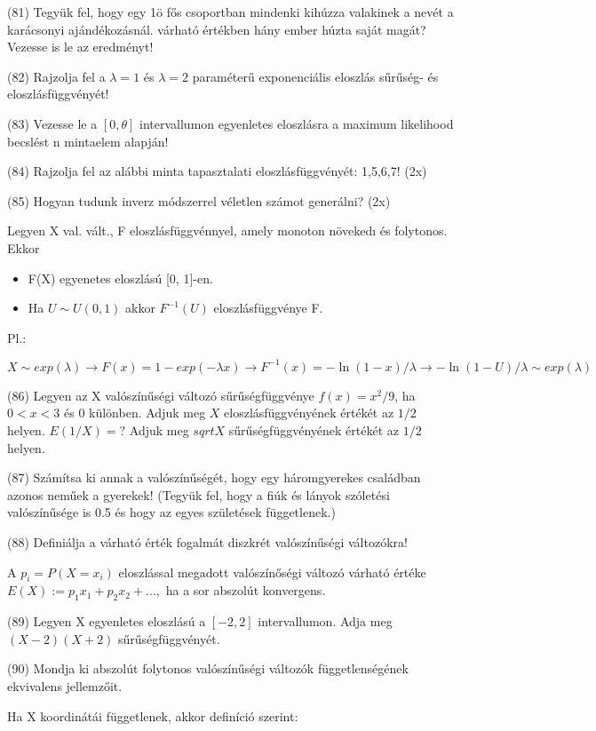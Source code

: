 \documentclass[12p]{article}
\begin{document}
(81) Tegyük fel, hogy egy 1ö fős csoportban mindenki kihúzza valakinek a nevét a karácsonyi ajándékozásnál. várható értékben hány ember húzta saját magát? Vezesse is le az eredményt!

(82) Rajzolja fel a $\lambda = 1$ és $\lambda = 2$ paraméterű exponenciális eloszlás sűrűség- és eloszlásfüggvényét!

(83) Vezesse le a $[0, \theta]$ intervallumon egyenletes eloszlásra a maximum likelihood becslést n mintaelem alapján!

(84) Rajzolja fel az alábbi minta tapasztalati eloszlásfüggvényét: 1,5,6,7! (2x)

(85) Hogyan tudunk inverz módszerrel véletlen számot generálni? (2x)

Legyen X val. vált., F eloszlásfüggvénnyel,
amely monoton növekedı és folytonos. Ekkor

\begin{itemize}
	\item F(X) egyenetes eloszlású [0, 1]-en.
	\item Ha $U \sim U(0, 1)$ akkor $F^{-1}(U)$ eloszlásfüggvénye F.
\end{itemize}

Pl.:

$$X \sim exp(\lambda) \rightarrow F(x) = 1-exp(-\lambda x) \rightarrow F^{-1}(x) = -\ln (1-x)/\lambda \rightarrow -\ln(1-U)/\lambda \sim exp(\lambda)$$

(86) Legyen az X valószínűségi változó sűrűségfüggvénye $f(x) = x^2/9$, ha $0 < x < 3$ és $0$ különben. Adjuk meg $X$ eloszlásfüggvényének értékét az $1/2$ helyen. $E(1/X)=?$ Adjuk meg $sqrt{X}$ sűrűségfüggvényének értékét az $1/2$ helyen.

(87) Számítsa ki annak a valószínűségét, hogy egy háromgyerekes családban azonos neműek a gyerekek! (Tegyük fel, hogy a fiúk és lányok szóletési valószínűsége is 0.5 és hogy az egyes születések függetlenek.)

(88) Definiálja a várható érték fogalmát diszkrét valószínűségi változókra!

A $p_i =P (X=x_i)$ eloszlással megadott valószínőségi változó várható értéke $E(X):= p_1x_1+ p_2x_2 +...,$ ha a sor abszolút konvergens.

(89)  Legyen X egyenletes eloszlású a $[-2,2]$ intervallumon. Adja meg $(X - 2)(X + 2)$ sűrűségfüggvényét.

(90) Mondja ki abszolút folytonos valószínűségi változók függetlenségének ekvivalens jellemzőit.

Ha X koordinátái függetlenek, akkor definíció szerint:
\end{document}
